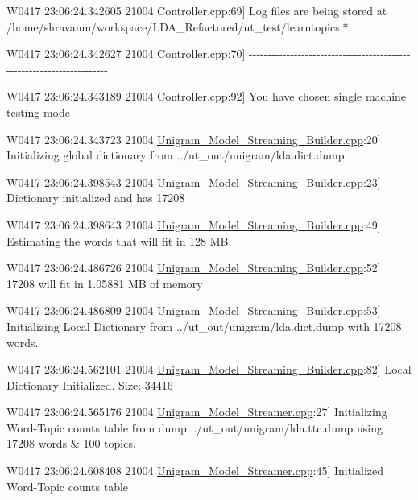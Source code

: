 {\ttfamily   }

{\ttfamily W0417 23:06:24.342605 21004 Controller.cpp:69\mbox{]} Log files are being stored at /home/shravanm/workspace/LDA\_\-Refactored/ut\_\-test/learntopics.$\ast$  }

{\ttfamily W0417 23:06:24.342627 21004 Controller.cpp:70\mbox{]} -\/-\/-\/-\/-\/-\/-\/-\/-\/-\/-\/-\/-\/-\/-\/-\/-\/-\/-\/-\/-\/-\/-\/-\/-\/-\/-\/-\/-\/-\/-\/-\/-\/-\/-\/-\/-\/-\/-\/-\/-\/-\/-\/-\/-\/-\/-\/-\/-\/-\/-\/-\/-\/-\/-\/-\/-\/-\/-\/-\/-\/-\/-\/-\/-\/-\/-\/-\/-\/-\/}

{\ttfamily   }

{\ttfamily W0417 23:06:24.343189 21004 Controller.cpp:92\mbox{]} You have chosen single machine testing mode  }

{\ttfamily W0417 23:06:24.343723 21004 \hyperlink{_unigram___model___streaming___builder_8cpp}{Unigram\_\-Model\_\-Streaming\_\-Builder.cpp}:20\mbox{]} Initializing global dictionary from ../ut\_\-out/unigram/lda.dict.dump  }

{\ttfamily W0417 23:06:24.398543 21004 \hyperlink{_unigram___model___streaming___builder_8cpp}{Unigram\_\-Model\_\-Streaming\_\-Builder.cpp}:23\mbox{]} Dictionary initialized and has 17208  }

{\ttfamily W0417 23:06:24.398643 21004 \hyperlink{_unigram___model___streaming___builder_8cpp}{Unigram\_\-Model\_\-Streaming\_\-Builder.cpp}:49\mbox{]} Estimating the words that will fit in 128 MB  }

{\ttfamily W0417 23:06:24.486726 21004 \hyperlink{_unigram___model___streaming___builder_8cpp}{Unigram\_\-Model\_\-Streaming\_\-Builder.cpp}:52\mbox{]} 17208 will fit in 1.05881 MB of memory  }

{\ttfamily W0417 23:06:24.486809 21004 \hyperlink{_unigram___model___streaming___builder_8cpp}{Unigram\_\-Model\_\-Streaming\_\-Builder.cpp}:53\mbox{]} Initializing Local Dictionary from ../ut\_\-out/unigram/lda.dict.dump with 17208 words.  }

{\ttfamily W0417 23:06:24.562101 21004 \hyperlink{_unigram___model___streaming___builder_8cpp}{Unigram\_\-Model\_\-Streaming\_\-Builder.cpp}:82\mbox{]} Local Dictionary Initialized. Size: 34416  }

{\ttfamily W0417 23:06:24.565176 21004 \hyperlink{_unigram___model___streamer_8cpp}{Unigram\_\-Model\_\-Streamer.cpp}:27\mbox{]} Initializing Word-\/Topic counts table from dump ../ut\_\-out/unigram/lda.ttc.dump using 17208 words \& 100 topics.  }

{\ttfamily W0417 23:06:24.608408 21004 \hyperlink{_unigram___model___streamer_8cpp}{Unigram\_\-Model\_\-Streamer.cpp}:45\mbox{]} Initialized Word-\/Topic counts table  }


